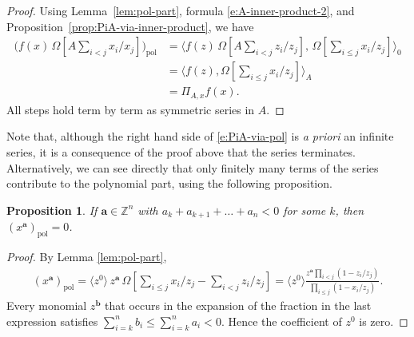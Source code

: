 \documentclass[12pt]{amsart}
\newtheorem{prop}[thm]{Proposition}
\theoremstyle{definition}
\theoremstyle{remark}
\newcommand{\ZZ}{{\mathbb Z}}
\newcommand{\aA}{{\mathbf a}}
\newcommand{\bb}{{\mathbf b}}
\DeclareMathOperator{\pol}{pol}
\begin{document}
\begin{proof}
Using Lemma~\ref{lem:pol-part}, formula \eqref{e:A-inner-product-2},
and Proposition~\ref{prop:PiA-via-inner-product}, we have
\begin{equation}\label{e:PiA-via-pol-proof}
\begin{aligned}
\bigl( f(x)\, \Omega [A \sum _{i<j} x_{i}/x_{j}] \bigr)_{\pol }
&  = \langle f(z) \, \Omega [A \sum
_{i<j} z_{i}/z_{j}],\, \Omega [\sum _{i\leq j} x_{i}/z_{j}]  \rangle _{0}\\
&  = \langle f(z),\Omega [\sum _{i\leq j} x_{i}/z_{j}] \rangle _{A}\\
& = \Pi _{A,x} f(x).
\end{aligned}
\end{equation}
All steps hold term by term as symmetric series in $A$.
\end{proof}

Note that, although the right hand side of \eqref{e:PiA-via-pol} is
{\it a priori} an infinite series, it is a consequence of the proof
above that the series terminates.  Alternatively, we can see directly
that only finitely many terms of the series contribute to the
polynomial part, using the following proposition.

\begin{prop} \label{p: pol part tail}
If ${\aA} \in \ZZ^n$ with $a_k + a_{k+1} + \dots + a_n < 0$ for some
$k$, then $(x^{\aA })_{\pol} = 0$.
\end{prop}
\begin{proof}
By Lemma \ref{lem:pol-part},
\begin{align}
(x^{\aA})_{\pol } = \langle z^0 \rangle \, z^{\aA} \, \Omega [\sum
_{i\leq j} x_{i}/z_{j} - \sum _{i < j} z_{i}/z_{j}] = \langle z^0
\rangle \frac{z^{\aA} \prod _{i < j} (1- z_{i}/z_{j})}{ \prod_{i\leq
j} (1-x_{i}/z_{j})}.
\end{align}
Every monomial $z^{\bb }$ that occurs in the expansion of the fraction
in the last expression satisfies $\sum_{i = k}^n b_i \le \sum_{i =
k}^n a_i < 0$. Hence the coefficient of $z^0$ is zero.
\end{proof}
\end{document}
